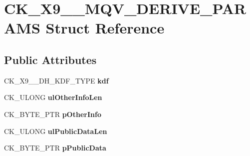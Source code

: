 \hypertarget{struct_c_k___x9__42___m_q_v___d_e_r_i_v_e___p_a_r_a_m_s}{}\section{C\+K\+\_\+\+X9\+\_\+\_\+\+M\+Q\+V\+\_\+\+D\+E\+R\+I\+V\+E\+\_\+\+P\+A\+R\+A\+MS Struct Reference}
\label{struct_c_k___x9__42___m_q_v___d_e_r_i_v_e___p_a_r_a_m_s}
\subsection*{Public Attributes}
\begin{DoxyCompactItemize}
\item 
\mbox{\label{struct_c_k___x9__42___m_q_v___d_e_r_i_v_e___p_a_r_a_m_s_a965fba30fd7a631cee344a00a5bd3d6b}} 
C\+K\+\_\+\+X9\+\_\+\_\+\+D\+H\+\_\+\+K\+D\+F\+\_\+\+T\+Y\+PE {\bfseries kdf}
\item 
\mbox{\label{struct_c_k___x9__42___m_q_v___d_e_r_i_v_e___p_a_r_a_m_s_aa80a232150511003ecfa7c321a8e4677}} 
C\+K\+\_\+\+U\+L\+O\+NG {\bfseries ul\+Other\+Info\+Len}
\item 
\mbox{\label{struct_c_k___x9__42___m_q_v___d_e_r_i_v_e___p_a_r_a_m_s_a62018889899366315fdddf361de1067a}} 
C\+K\+\_\+\+B\+Y\+T\+E\+\_\+\+P\+TR {\bfseries p\+Other\+Info}
\item 
\mbox{\label{struct_c_k___x9__42___m_q_v___d_e_r_i_v_e___p_a_r_a_m_s_a1b56b193d1d5ad0e3ed5b949db027461}} 
C\+K\+\_\+\+U\+L\+O\+NG {\bfseries ul\+Public\+Data\+Len}
\item 
\mbox{\label{struct_c_k___x9__42___m_q_v___d_e_r_i_v_e___p_a_r_a_m_s_a5e3deb0e3e248939fcbf0d9d57b53d54}} 
C\+K\+\_\+\+B\+Y\+T\+E\+\_\+\+P\+TR {\bfseries p\+Public\+Data}
\item 
\mbox{\label{struct_c_k___x9__42___m_q_v___d_e_r_i_v_e___p_a_r_a_m_s_ad392b100cfcc3bc90e2bf2623ef24b1f}} 

\end{DoxyCompactItemize}
